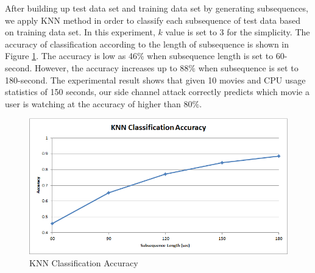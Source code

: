 After building up test data set and training data set by generating subsequences, we apply KNN method in order to classify each subsequence of test data based on training data set. 
In this experiment, $k$ value is set to 3 for the simplicity.
The accuracy of classification according to the length of subsequence is shown in Figure \ref{fig:experiment_knn}.
The accuracy is low as 46$\%$ when subsequence length is set to 60-second.
However, the accuracy increases up to 88$\%$ when subsequence is set to 180-second.
The experimental result shows that given 10 movies and CPU usage statistics of 150 seconds, our side channel attack correctly predicts which movie a user is watching at the accuracy of higher than 80$\%$.

\begin{figure}[!ht]
\centering
\includegraphics[scale=0.50]{Figures/experiment_knn}
\caption{KNN Classification Accuracy}
\label{fig:experiment_knn}
\end{figure}

